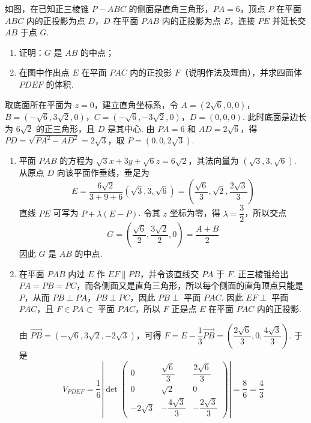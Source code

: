 \begin{problem}
如图，在已知正三棱锥 \(P-ABC\) 的侧面是直角三角形，\(PA=6\)，顶点 \(P\) 在平面 \(ABC\) 内的正投影为点 \(D\)，\(D\) 在平面 \(PAB\) 内的正投影为点 \(E\)，连接 \(PE\) 并延长交 \(AB\) 于点 \(G\).

\begin{enumerate}
\item 证明：\(G\) 是 \(AB\) 的中点；
\item 在图中作出点 \(E\) 在平面 \(PAC\) 内的正投影 \(F\)（说明作法及理由），并求四面体 \(PDEF\) 的体积.
\end{enumerate}

\problemresetlayout
{}
\end{problem}

\begin{solution}
取底面所在平面为 \(z=0\)，建立直角坐标系，令
\(A=(2\sqrt6,0,0)\)，\(B=(-\sqrt6,3\sqrt2,0)\)，\(C=(-\sqrt6,-3\sqrt2,0)\)，\(D=(0,0,0)\). 此时底面是边长为 \(6\sqrt2\) 的正三角形，且 \(D\) 是其中心. 由 \(PA=6\) 和 \(AD=2\sqrt6\)，得 \(PD=\sqrt{PA^2-AD^2}=2\sqrt3\)，取 \(P=(0,0,2\sqrt3)\).

\begin{enumerate}
\item 平面 \(PAB\) 的方程为 \(\sqrt3x+3y+\sqrt6z=6\sqrt2\)，其法向量为 \((\sqrt3,3,\sqrt6)\). 从原点 \(D\) 向该平面作垂线，垂足为
\[
E=\frac{6\sqrt2}{3+9+6}(\sqrt3,3,\sqrt6)=\left(\frac{\sqrt6}{3},\sqrt2,\frac{2\sqrt3}{3}\right)
\]
直线 \(PE\) 可写为 \(P+\lambda(E-P)\). 令其 \(z\) 坐标为零，得 \(\lambda=\dfrac32\)，所以交点
\[
G=\left(\frac{\sqrt6}{2},\frac{3\sqrt2}{2},0\right)=\frac{A+B}{2}
\]
因此 \(G\) 是 \(AB\) 的中点.
\item 在平面 \(PAB\) 内过 \(E\) 作 \(EF\parallel PB\)，并令该直线交 \(PA\) 于 \(F\). 正三棱锥给出 \(PA=PB=PC\)，而各侧面又是直角三角形，所以每个侧面的直角顶点只能是 \(P\)，从而 \(PB\perp PA\)，\(PB\perp PC\)，因此 \(PB\perp\) 平面 \(PAC\). 因此 \(EF\perp\) 平面 \(PAC\)，且 \(F\in PA\subset\) 平面 \(PAC\)，所以 \(F\) 正是点 \(E\) 在平面 \(PAC\) 内的正投影.

由 \(\overrightarrow{PB}=(-\sqrt6,3\sqrt2,-2\sqrt3)\)，可得 \(F=E-\dfrac13\overrightarrow{PB}=\left(\dfrac{2\sqrt6}{3},0,\dfrac{4\sqrt3}{3}\right)\). 于是
\[
V_{PDEF}=\frac16\left|\det\begin{pmatrix}
0&\dfrac{\sqrt6}{3}&\dfrac{2\sqrt6}{3}\\
0&\sqrt2&0\\
-2\sqrt3&-\dfrac{4\sqrt3}{3}&-\dfrac{2\sqrt3}{3}
\end{pmatrix}\right|=\frac{8}{6}=\frac43
\]
\end{enumerate}
\end{solution}

